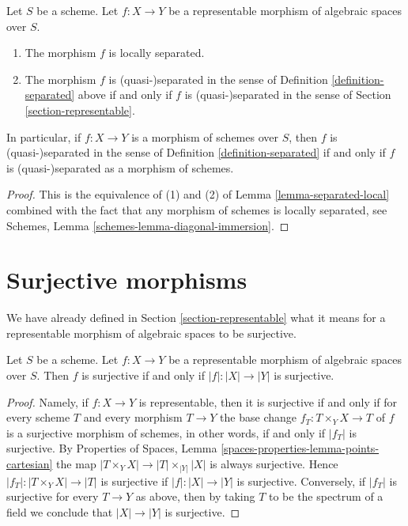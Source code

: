 \begin{lemma}
\label{lemma-match-separated}
Let $S$ be a scheme.
Let $f : X \to Y$ be a representable morphism of algebraic spaces over $S$.
\begin{enumerate}
\item The morphism $f$ is locally separated.
\item The morphism $f$ is (quasi-)separated in the sense of
Definition \ref{definition-separated}
above if and only if $f$ is (quasi-)separated in the sense of
Section \ref{section-representable}.
\end{enumerate}
In particular, if $f : X \to Y$ is a morphism of schemes over $S$, then
$f$ is (quasi-)separated in the sense of
Definition \ref{definition-separated}
if and only if $f$ is (quasi-)separated as a morphism of schemes.
\end{lemma}

\begin{proof}
This is the equivalence of (1) and (2) of
Lemma \ref{lemma-separated-local}
combined with the fact that any morphism of schemes is locally separated, see
Schemes, Lemma \ref{schemes-lemma-diagonal-immersion}.
\end{proof}











\section{Surjective morphisms}
\label{section-surjective}

\noindent
We have already defined in Section \ref{section-representable}
what it means for a representable morphism of algebraic spaces
to be surjective.

\begin{lemma}
\label{lemma-surjective-representable}
Let $S$ be a scheme. Let $f : X \to Y$ be a representable
morphism of algebraic spaces over $S$. Then
$f$ is surjective if and only if $|f| : |X| \to |Y|$ is surjective.
\end{lemma}

\begin{proof}
Namely, if $f : X \to Y$ is representable, then it is surjective if and only if
for every scheme $T$ and every morphism $T \to Y$ the base change
$f_T : T \times_Y X \to T$ of $f$ is a surjective morphism of schemes,
in other words, if and only if $|f_T|$ is surjective. By
Properties of Spaces, Lemma \ref{spaces-properties-lemma-points-cartesian}
the map $|T \times_Y X| \to |T| \times_{|Y|} |X|$ is always surjective.
Hence $|f_T| : |T \times_Y X| \to |T|$ is surjective if $|f| : |X| \to |Y|$
is surjective. Conversely, if $|f_T|$ is surjective
for every $T \to Y$ as above, then by taking $T$ to be the spectrum of a
field we conclude that $|X| \to |Y|$ is surjective.
\end{proof}

